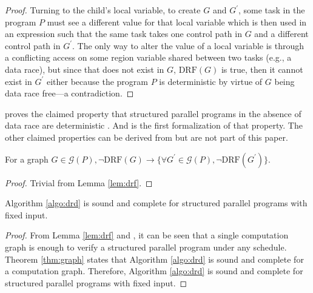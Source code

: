 \begin{proof}
  Turning to the child's local variable, to create $G$ and $G^\prime$, some task in the program $P$ must see a different value for that local variable which is then used in an expression such that the same task takes one control path in $G$ and a different control path in $G^\prime$. The only way to alter the value of a local variable is through a conflicting access on some region variable shared between two tasks (e.g., a data race), but since that does not exist in $G$, $\mathrm{DRF}( G )$ is true, then it cannot exist in $G^\prime$ either because the program $P$ is deterministic by virtue of $G$ being data race free---a contradiction. 
\end{proof}

 proves the claimed property that structured parallel programs in the absence of data race are deterministic \cite{cave2011habanero}. And is the first formalization of that property. The other claimed properties can be derived from  but are not part of this paper. 

\begin{corollary} \label{cor:notdrf}
For a graph $G \in \mathcal{G}( P ), \neg\mathrm{DRF}( G ) \rightarrow \{\forall G^\prime \in \mathcal{G}( P ), \neg\mathrm{DRF}( G^\prime ) \}$.
\end{corollary}
\begin{proof}
Trivial from Lemma \ref{lem:drf}.
\end{proof}

\begin{theorem} \label{thm:strcutured-par-progs}
Algorithm \ref{algo:drd} is sound and complete for structured parallel programs with fixed input.
\end{theorem}
\begin{proof}
From Lemma \ref{lem:drf} and , it can be seen that a single computation graph is enough to verify a structured parallel program under any schedule. Theorem \ref{thm:graph} states that Algorithm \ref{algo:drd} is sound and complete for a computation graph. Therefore, Algorithm \ref{algo:drd} is sound and complete for structured parallel programs with fixed input.
\end{proof}
